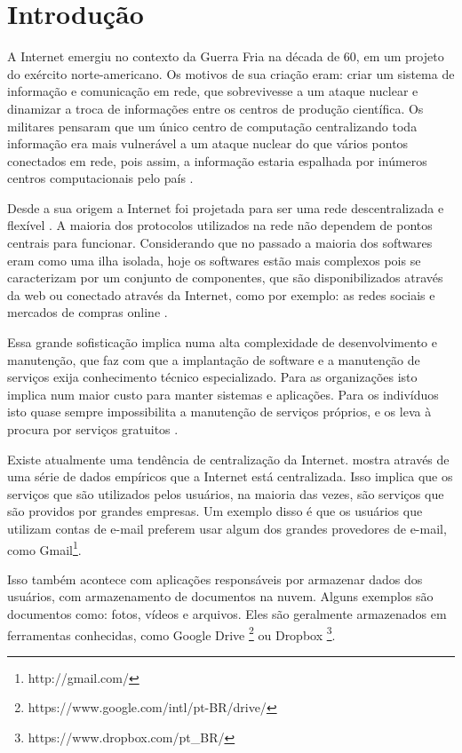 \chapter{Introdução}
\label{cap-introducao}

A Internet emergiu no contexto da Guerra Fria na década
de 60, em um projeto do exército norte-americano. Os motivos de sua criação eram:
criar um sistema de informação e comunicação em rede, que
sobrevivesse a um ataque nuclear e dinamizar a troca de informações entre os centros de
produção científica. Os militares pensaram que um único centro de computação
centralizando toda informação era mais vulnerável a um ataque nuclear do que vários
pontos conectados em rede, pois assim, a informação estaria espalhada por inúmeros
centros computacionais pelo país \cite{giles2010psychology}.

Desde a sua origem a Internet foi projetada para ser uma rede
descentralizada e flexível \cite{galaxia}. A maioria dos protocolos
utilizados na rede não dependem de pontos centrais para funcionar. 
Considerando que no
passado a maioria dos softwares eram como uma ilha isolada, hoje os softwares 
estão mais complexos pois se caracterizam por um conjunto de componentes, que 
são disponibilizados através da web ou conectado através da Internet,
como por exemplo: as redes sociais e mercados de compras online \cite{byhand}.

Essa grande sofisticação implica numa alta complexidade de
desenvolvimento e manutenção, que faz com que a
implantação de software e a manutenção de serviços exija conhecimento técnico
especializado. Para as organizações isto implica num maior
custo para manter sistemas e aplicações. Para os indivíduos isto quase sempre
impossibilita a manutenção de serviços próprios, e os leva à procura por serviços
gratuitos \cite{shak2015}.

Existe atualmente uma tendência de centralização da Internet. 
mostra
através de uma série de dados empíricos que a Internet está centralizada. Isso
implica que os serviços que são utilizados pelos usuários, na maioria
das vezes, são serviços que são providos por grandes empresas. 
Um exemplo disso é que os usuários que utilizam contas de e-mail preferem usar algum
dos grandes provedores de e-mail, como Gmail\footnote{http://gmail.com/}. 

Isso também acontece com aplicações responsáveis por armazenar dados dos usuários,
com armazenamento de documentos na nuvem. Alguns exemplos são 
documentos como: fotos, vídeos e arquivos. Eles são geralmente armazenados em 
ferramentas conhecidas, como Google Drive 
\footnote{https://www.google.com/intl/pt-BR/drive/} ou Dropbox \footnote{https://www.dropbox.com/pt\_BR/}. 

